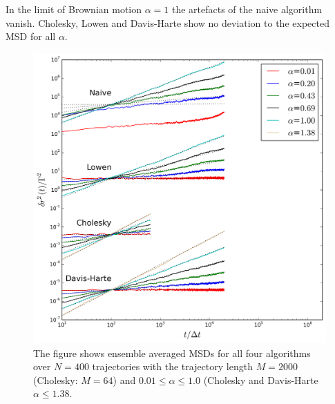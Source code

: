 \documentclass[
  a4paper,BCOR10mm,oneside,
  headsepline,footsepline,%
  fleqn,openbib
]{scrbook}
\begin{document}
In the limit of Brownian motion $\alpha=1$ the artefacts of the naive algorithm  vanish. Cholesky, Lowen and Davis-Harte show no deviation to the expected MSD for all $\alpha$. \par
\begin{figure}[h!]
\centering
\includegraphics[width=\textwidth]{./data/alpha_changethreeneu.png}
\caption{The figure shows ensemble averaged MSDs for all four algorithms over $N=400$ trajectories with the trajectory length $M=2000$ (Cholesky: $M=64$) and $0.01\leq\alpha\leq1.0$ (Cholesky and Davis-Harte $\alpha\leq1.38$.}
\label{alphachange}
\end{figure}
\end{document}
